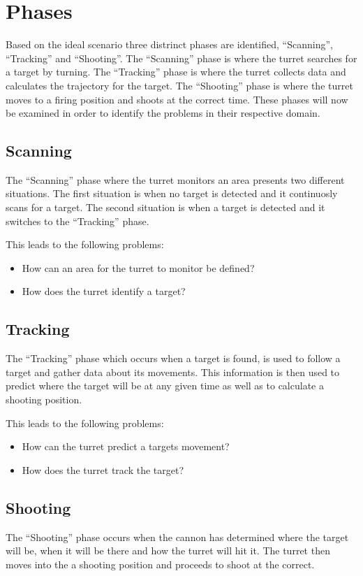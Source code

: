 
\section{Phases}
Based on the ideal scenario three distrinct phases are identified,
``Scanning'', ``Tracking'' and ``Shooting''. The ``Scanning'' phase is where
the turret searches for a target by turning. The ``Tracking'' phase is where the
turret collects data and calculates the trajectory for the target. The
``Shooting'' phase is where the turret moves to a firing position and shoots at
the correct time. These phases will now be examined in order to identify the
problems in their respective domain.

\subsection{Scanning}
The ``Scanning'' phase where the turret monitors an area presents two different
situations. The first situation is when no target is detected and it continuosly
scans for a target. The second situation is when a target is detected and it
switches to the ``Tracking'' phase.\nl

This leads to the following problems:
\begin{itemize}
  \item How can an area for the turret to monitor be defined?
  \item How does the turret identify a target?
\end{itemize}

\subsection{Tracking}
The ``Tracking'' phase which occurs when a target is found, is used to follow a
target and gather data about its movements. This information is then used to
predict where the target will be at any given time as well as to calculate a
shooting position.\nl

This leads to the following problems:
\begin{itemize}
  \item How can the turret predict a targets movement?
  \item How does the turret track the target?
\end{itemize}

\subsection{Shooting}
The ``Shooting'' phase occurs when the cannon has determined where the target
will be, when it will be there and how the turret will hit it. The turret then moves
into the a shooting position and proceeds to shoot at the correct.\nl

